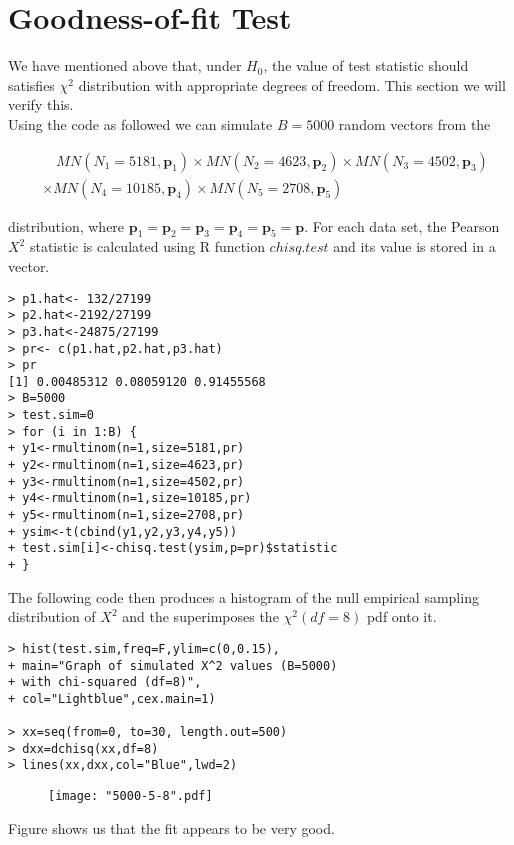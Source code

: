 \documentclass[12pt]{article}
\begin{document}
\section{Goodness-of-fit Test}
We have mentioned above that, under $H_0$, the value of test statistic should satisfies $\chi^2$ distribution with appropriate degrees of freedom. This section we will verify this.\\

\noindent
Using the code as followed we can simulate $B = 5000$ random vectors from the 

\bigskip{}
\noindent
\begin{equation}
\begin{split}
&\quad MN(N_1 = 5181, \textbf{p}_1)\times MN(N_2 = 4623, \textbf{p}_2)\times MN(N_3 = 4502, \textbf{p}_3)\\
&\times MN(N_4 = 10185, \textbf{p}_4)\times MN(N_5 = 2708, \textbf{p}_5)
\end{split}
\end{equation} 

\bigskip{}
\noindent
distribution, where $\textbf{p}_1=\textbf{p}_2=\textbf{p}_3=\textbf{p}_4=\textbf{p}_5=\textbf{p}$. For each data set, the Pearson $X^2$ statistic is calculated using R function $chisq.test$ and its value is stored in a vector. 

\begin{verbatim}
> p1.hat<- 132/27199
> p2.hat<-2192/27199
> p3.hat<-24875/27199
> pr<- c(p1.hat,p2.hat,p3.hat)
> pr
[1] 0.00485312 0.08059120 0.91455568
> B=5000
> test.sim=0
> for (i in 1:B) {
+ y1<-rmultinom(n=1,size=5181,pr) 
+ y2<-rmultinom(n=1,size=4623,pr)
+ y3<-rmultinom(n=1,size=4502,pr)
+ y4<-rmultinom(n=1,size=10185,pr)
+ y5<-rmultinom(n=1,size=2708,pr)
+ ysim<-t(cbind(y1,y2,y3,y4,y5))
+ test.sim[i]<-chisq.test(ysim,p=pr)$statistic
+ }
\end{verbatim}
The following code then produces a histogram of the null empirical sampling distribution of $X^2$ and the superimposes the $\chi^2(df=8)$ pdf onto it. 
\begin{verbatim}
> hist(test.sim,freq=F,ylim=c(0,0.15),
+ main="Graph of simulated X^2 values (B=5000) 
+ with chi-squared (df=8)",
+ col="Lightblue",cex.main=1)
 
> xx=seq(from=0, to=30, length.out=500)
> dxx=dchisq(xx,df=8)
> lines(xx,dxx,col="Blue",lwd=2)
\end{verbatim} 

\begin{figure}[h]
		\centering
	\texttt{[image: "5000-5-8".pdf]}
\end{figure}
Figure shows us that the fit appears to be very good.
\end{document}
